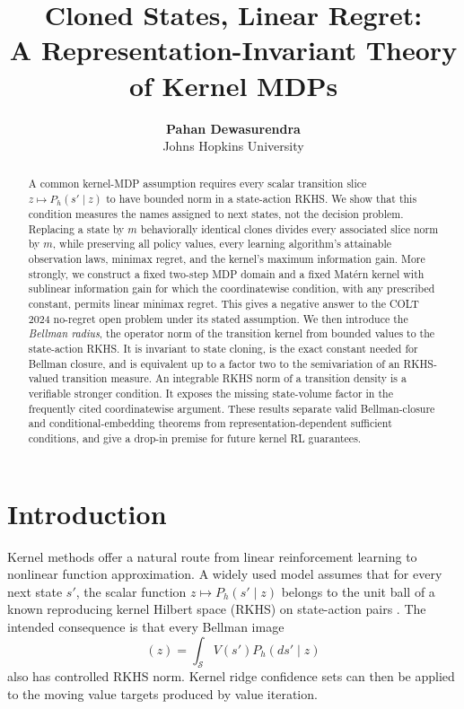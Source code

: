 \documentclass{article}
\title{Cloned States, Linear Regret:\\A Representation-Invariant Theory of Kernel MDPs}
\author{\textbf{Pahan Dewasurendra} \\ Johns Hopkins University}
\newcommand{\cS}{\mathcal S}
\begin{document}
\maketitle

\begin{abstract}
A common kernel-MDP assumption requires every scalar transition slice $z\mapsto P_h(s'\mid z)$ to have bounded norm in a state-action RKHS. We show that this condition measures the names assigned to next states, not the decision problem. Replacing a state by $m$ behaviorally identical clones divides every associated slice norm by $m$, while preserving all policy values, every learning algorithm's attainable observation laws, minimax regret, and the kernel's maximum information gain. More strongly, we construct a fixed two-step MDP domain and a fixed Mat\'ern kernel with sublinear information gain for which the coordinatewise condition, with any prescribed constant, permits linear minimax regret. This gives a negative answer to the COLT 2024 no-regret open problem under its stated assumption. We then introduce the \emph{Bellman radius}, the operator norm of the transition kernel from bounded values to the state-action RKHS. It is invariant to state cloning, is the exact constant needed for Bellman closure, and is equivalent up to a factor two to the semivariation of an RKHS-valued transition measure. An integrable RKHS norm of a transition density is a verifiable stronger condition. It exposes the missing state-volume factor in the frequently cited coordinatewise argument. These results separate valid Bellman-closure and conditional-embedding theorems from representation-dependent sufficient conditions, and give a drop-in premise for future kernel RL guarantees.
\end{abstract}

\section{Introduction}

Kernel methods offer a natural route from linear reinforcement learning to nonlinear function approximation. A widely used model assumes that for every next state $s'$, the scalar function $z\mapsto P_h(s'\mid z)$ belongs to the unit ball of a known reproducing kernel Hilbert space (RKHS) on state-action pairs \citep{yang2020kernel,yeh2023sample,vakili2023kernel, vakili2024rewardfree,vakili2024average,kayal2025rewardfree}. The intended consequence is that every Bellman image
\begin{equation}
  [P_hV](z)=\int_{\cS}V(s')P_h(ds'\mid z)
  \label{eq:bellman-image}
\end{equation}
also has controlled RKHS norm. Kernel ridge confidence sets can then be applied to the moving value targets produced by value iteration.
\end{document}
